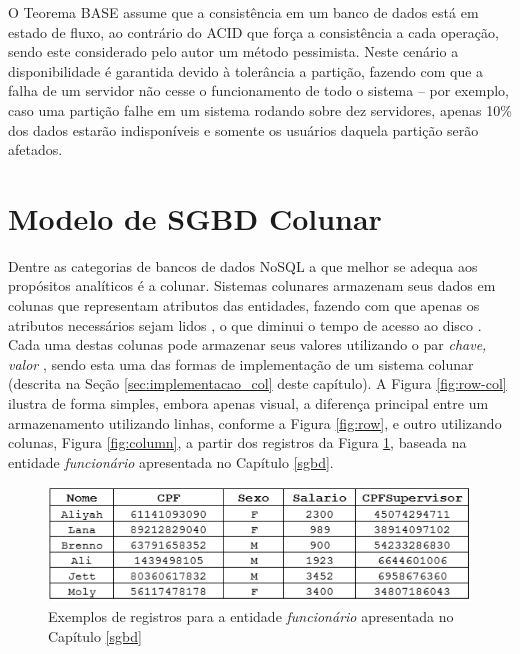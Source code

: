 O Teorema BASE assume que a consistência em um banco 
de dados está em estado de fluxo, ao contrário do ACID que força a consistência a cada operação, 
sendo este considerado pelo autor um método pessimista. 
Neste cenário a disponibilidade é garantida devido à tolerância a partição, fazendo 
com que a falha de um servidor não cesse o funcionamento de todo o sistema -- por exemplo, caso uma partição falhe em um sistema rodando sobre dez servidores, apenas 10\% dos dados estarão indisponíveis e somente os usuários daquela partição serão afetados.


\section{Modelo de SGBD Colunar}

Dentre as categorias de bancos de dados NoSQL a que melhor se adequa aos 
propósitos analíticos é a colunar. Sistemas colunares armazenam seus dados 
em colunas que representam atributos das entidades, fazendo com que apenas os atributos necessários sejam 
lidos \cite{khoshafian1987query}, o que diminui o tempo de acesso 
ao disco \cite{matei2010column, abadi2008column}. Cada uma destas colunas pode armazenar seus valores utilizando o par 
\textit{chave, valor} \cite{abadi2013design, khoshafian1987query}, sendo esta uma das formas de implementação 
de um sistema colunar (descrita na Seção \ref{sec:implementacao_col} deste capítulo). 
A Figura \ref{fig:row-col} ilustra de forma simples, embora apenas visual, 
a diferença principal entre um armazenamento utilizando linhas, conforme a Figura \ref{fig:row}, e outro utilizando 
colunas, Figura \ref{fig:column}, a partir dos registros da Figura \ref{fig:regs}, baseada na entidade \textit{funcionário} apresentada no Capítulo \ref{sgbd}.

\begin{figure}[htpb]
	\centering
		\includegraphics[width=12cm]{registros}
	\caption{Exemplos de registros para a entidade \textit{funcionário} apresentada no Capítulo \ref{sgbd}}
	\label{fig:regs}
\end{figure}

